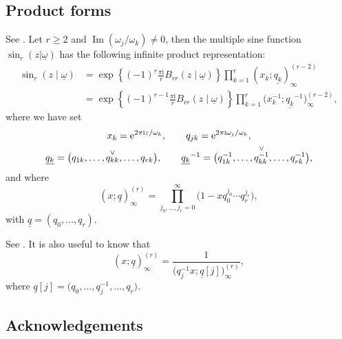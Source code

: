 \documentclass[pdftex]{sigma}
\numberwithin{equation}{section}
\begin{document}
\subsection{Product forms}\label{app:productform}
See \cite[Proposition~5]{Narukawa}. Let $r\ge 2$ and $\operatorname{Im} (\omega_j/\omega_k) \ne 0$, then the multiple sine function $\sin_r(z|\underline{\omega})$ has the following infinite product representation:
\begin{align}
 \sin_r(z\mid \underline{\omega}) &= \exp \left\{ (-1)^r \frac{\pi \mathrm{i}}{r} B_{rr}(z\mid \underline{\omega})\right\} \prod_{k=1}^r (x_k;\underline{q_k})_{\infty}^{(r-2)} \nonumber\\
 &= \exp \left\{ (-1)^{r-1} \frac{\pi \mathrm{i}}{r} B_{rr}(z\mid \underline{\omega})\right\} \prod_{k=1}^r \big(x_k^{-1};\underline{q_k}^{-1}\big)_{\infty}^{(r-2)},\label{eq:multiplesineproduct}
 \end{align}
where we have set
\begin{gather*}
x_k={\rm e}^{2\pi \mathrm{i} z/\omega_k}, \qquad
q_{jk}={\rm e}^{2\pi \mathrm{i} \omega_j/\omega_k},\\ \underline{q_k}=\big(q_{1k},\dots,\overset{\vee}{q_{kk}},\dots,q_{rk}\big), \qquad \underline{q_{k}}^{-1}= \big(q_{1k}^{-1},\dots,\overset{\vee}{q_{kk}^{-1}},\dots,q_{rk}^{-1}\big),
\end{gather*}
and where
\begin{equation*}
 (x;\underline{q})_{\infty}^{(r)}= \prod_{j_0,\dots,j_r=0}^{\infty} \big(1-x q_0^{j_0} \cdots q_r^{j_r}\big),
\end{equation*}
with $\underline{q}= (q_0,\dots,q_r)$.

See \cite[Proposition~1]{Narukawa}. It is also useful to know that
\begin{equation}\label{eq:productinvpow}
 (x;\underline{q})_{\infty}^{(r)} = \frac{1}{\big(q_j^{-1}x;\underline{q}[j]\big)_{\infty}^{(r)}},
\end{equation}
where
$\underline{q}[j]= \big(q_0,\dots,q_j^{-1}, \dots,q_r\big)$.

\subsection*{Acknowledgements}
\end{document}
